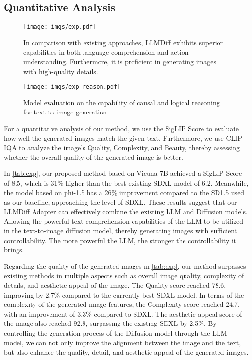 \subsection{Quantitative Analysis}

\begin{figure*}[t]
    \centering
    \texttt{[image: imgs/exp.pdf]}
    \vspace{-10pt}
    \caption{In comparison with existing approaches, LLMDiff exhibits superior capabilities in both language comprehension and action understanding. Furthermore, it is proficient in generating images with high-quality details. %
    }

    \label{fig:exp}
    \vspace{-10pt}
\end{figure*}

\begin{figure*}[t]
    \centering
    \texttt{[image: imgs/exp\_reason.pdf]}
    \vspace{-10pt}
    \caption{Model evaluation on the capability of causal and logical reasoning for text-to-image generation.}

    \label{fig:exp_reason}
    \vspace{-10pt}
\end{figure*}

For a quantitative analysis of our method, we use the SigLIP Score to evaluate how well the generated images match the given text. Furthermore, we use CLIP-IQA to analyze the image's Quality, Complexity, and Beauty, thereby assessing whether the overall quality of the generated image is better. 

In \cref{tab:exp}, our proposed method based on Vicuna-7B achieved a SigLIP Score of 8.5, which is 31\% higher than the best existing SDXL model of 6.2. Meanwhile, the model based on phi-1.5 has a 26\% improvement compared to the SD1.5 used as our baseline, approaching the level of SDXL. These results suggest that our LLMDiff Adapter can effectively combine the existing LLM and Diffusion models. Allowing the powerful text comprehension capabilities of the LLM to be utilized in the text-to-image diffusion model, thereby generating images with sufficient controllability. The more powerful the LLM, the stronger the controllability it brings.

Regarding the quality of the generated images in \cref{tab:exp}, our method surpasses existing methods in multiple aspects such as overall image quality, complexity of details, and aesthetic appeal of the image. The Quality score reached 78.6, improving by 2.7\% compared to the currently best SDXL model. In terms of the complexity of the generated image features, the Complexity score reached 24.7, with an improvement of 3.3\% compared to SDXL. The aesthetic appeal score of the image also reached 92.9, surpassing the existing SDXL by 2.5\%. By controlling the generation process of the Diffusion model through the LLM model, we can not only improve the alignment between the image and the text, but also enhance the quality, detail, and aesthetic appeal of the generated images.

